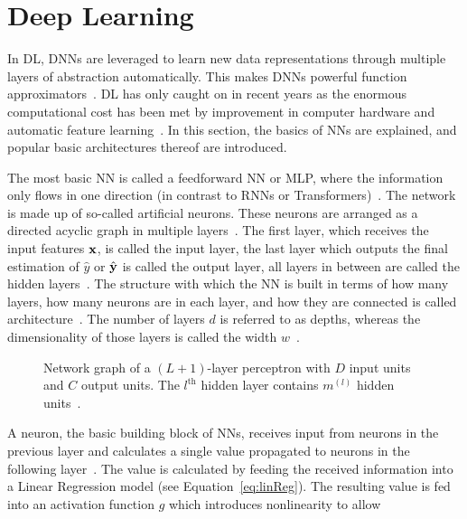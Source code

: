 \section{Deep Learning}
In \ac{DL}, \acp{DNN} are leveraged to learn new data representations through
multiple layers of abstraction automatically.
This makes \acp{DNN} powerful function approximators~\citep{goodfellow_deep_2016}.
\ac{DL} has only caught on in recent years as the enormous computational cost has been met
by improvement in computer hardware and automatic feature
learning~\citep{ponti_everything_2017, chen_text_2021}.
In this section, the basics of \acp{NN} are explained, and popular basic architectures thereof are
introduced.

The most basic \ac{NN} is called a feedforward \ac{NN} or \ac{MLP}, where the information only
flows in one direction (in contrast to \acp{RNN} or Transformers)~\citep{goodfellow_deep_2016}.
The network is made up of so-called artificial neurons.
These neurons are arranged as a directed acyclic graph in multiple
layers~\citep{goodfellow_deep_2016}.
The first layer, which receives the input features $\textbf{x}$, is called the input layer, the last layer
which outputs the final estimation of $\hat{y}$ or $\hat{\textbf{y}}$ is called the output layer, all layers in between
are called the hidden layers~\citep{shrestha_review_2019}.
The structure with which the \ac{NN} is built in terms of how many layers, how many neurons are in
each layer, and how they are connected is called architecture~\citep{goodfellow_deep_2016}.
The number of layers $d$ is referred to as depths, whereas the dimensionality of those layers is
called the width $w$~\citep{goodfellow_deep_2016}.
\begin{figure}[ht]
	\centering
    
	\caption[Network graph for a MLP]{%
        Network graph of a $(L+1)$-layer perceptron with $D$ input units and $C$ output units.
        The $l^{\text{th}}$ hidden layer contains $m^{(l)}$ hidden
        units~\citep{chauhan_review_2018,goodfellow_deep_2016}.\label{fig:multilayer-perceptron}
    }
\end{figure}
A neuron, the basic building block of \acp{NN}, receives input from neurons in the previous layer
and calculates a single value propagated to neurons in the following
layer~\citep{shrestha_review_2019}.
The value is calculated by feeding the received information into a Linear Regression model (see
Equation~\ref{eq:linReg}).
The resulting value is fed into an activation function $g$ which introduces nonlinearity to allow
